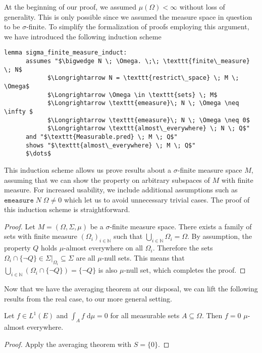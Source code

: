 At the beginning of our proof, we assumed $\mu(\Omega) < \infty$ without loss of generality. This is only possible since we assumed the measure space in question to be $\sigma$-finite. To simplify the formalization of proofs employing this argument, we have introduced the following induction scheme

\begin{isalemma}
{\small
	\begin{lstlisting}[style=isabelle]
	lemma sigma_finite_measure_induct:
	  assumes "$\bigwedge N \; \Omega. \;\; \texttt{finite\_measure} \; N$
			$\Longrightarrow N = \texttt{restrict\_space} \; M \; \Omega$
			$\Longrightarrow \Omega \in \texttt{sets} \; M$
			$\Longrightarrow \texttt{emeasure}\; N \; \Omega \neq \infty $
			$\Longrightarrow \texttt{emeasure}\; N \; \Omega \neq 0$
			$\Longrightarrow \texttt{almost\_everywhere} \; N \; Q$"
	  and "$\texttt{Measurable.pred} \; M \; Q$"
	  shows "$\texttt{almost\_everywhere} \; M \; Q$"
	  $\dots$
	\end{lstlisting}
}
\end{isalemma}

This induction scheme allows us prove results about a $\sigma$-finite measure space $M$, assuming that we can show the property on arbitrary subspaces of $M$ with finite measure. For increased usability, we include additional assumptions such as $\texttt{emeasure}\; N \; \Omega \neq 0$ which let us to avoid unnecessary trivial cases. The proof of this induction scheme is straightforward.
\begin{proof}
Let $M = (\Omega, \Sigma, \mu)$ be a $\sigma$-finite measure space. There exists a family of sets with finite measure $(\Omega_i)_{i \in \mathbb{N}}$ such that $\bigcup_{i \in \mathbb{N}} \Omega_i = \Omega$. By assumption, the property $Q$ holds $\mu$-almost everywhere on all $\Omega_i$. Therefore the sets $\Omega_i \cap \{\neg Q\} \in \Sigma\vert_{\Omega_i} \subseteq \Sigma$ are all $\mu$-null sets. This means that $\bigcup_{i \in \mathbb{N}} (\Omega_i \cap \{\neg Q\}) = \{\neg Q\}$ is also $\mu$-null set, which completes the proof.
\end{proof}

Now that we have the averaging theorem at our disposal, we can lift the following results from the real case, to our more general setting.

\begin{corollary}
	Let $f \in L^1(E)$ and $\int_A f \;\textrm{d}\mu = 0$ for all measurable sets $A \subseteq \Omega$. Then $f = 0$ $\mu$-almost everywhere. 
\end{corollary}
\begin{proof}
	Apply the averaging theorem with $S = \{0\}$.
\end{proof}

